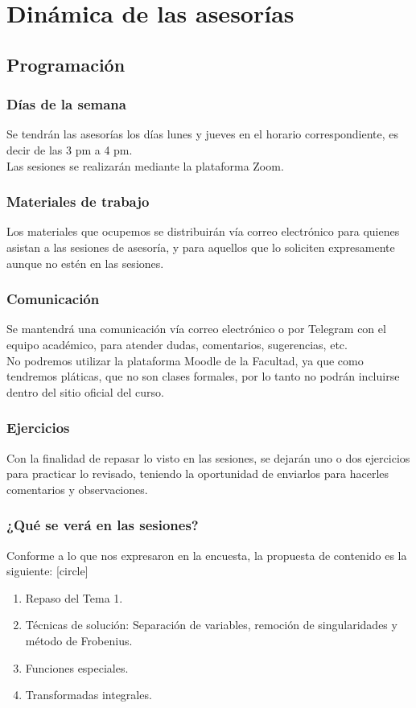 \section{Dinámica de las asesorías}
\subsection{Programación}

\begin{frame}
\frametitle{Días de la semana}
Se tendrán las asesorías los días lunes y jueves en el horario correspondiente, es decir de las 3 pm a 4 pm.
\\
\bigskip
\pause
Las sesiones se realizarán mediante la plataforma Zoom.
\end{frame}
\begin{frame}
\frametitle{Materiales de trabajo}
Los materiales que ocupemos se distribuirán vía correo electrónico para quienes asistan a las sesiones de asesoría, y para aquellos que lo soliciten expresamente aunque no estén en las sesiones.
\end{frame}
\begin{frame}
\frametitle{Comunicación}
Se mantendrá una comunicación vía correo electrónico o por Telegram con el equipo académico, para atender dudas, comentarios, sugerencias, etc.
\\
\bigskip
\pause
No podremos utilizar la plataforma Moodle de la Facultad, ya que como tendremos pláticas, que no son clases formales, por lo tanto no podrán incluirse dentro del sitio oficial del curso.
\end{frame}
\begin{frame}
\frametitle{Ejercicios}
Con la finalidad de repasar lo visto en las sesiones, se dejarán uno o dos ejercicios para practicar lo revisado, teniendo la oportunidad de enviarlos para hacerles comentarios y observaciones.
\end{frame}
\begin{frame}
\frametitle{¿Qué se verá en las sesiones?}
Conforme a lo que nos expresaron en la encuesta, la propuesta de contenido es la siguiente:
[circle]
\begin{enumerate}[<+->]
\item Repaso del Tema 1.
\item Técnicas de solución: Separación de variables, remoción de singularidades y método de Frobenius.
\item Funciones especiales.
\item Transformadas integrales.
\end{enumerate}
\end{frame}
